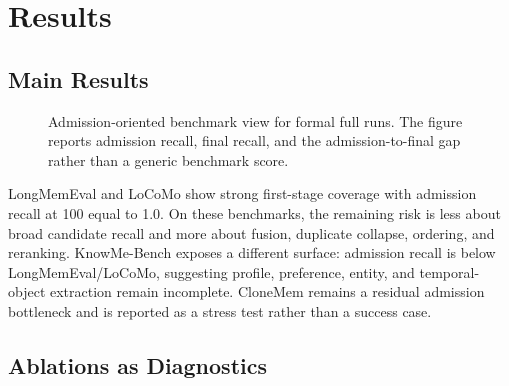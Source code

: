 \documentclass[10pt]{article}
\newcommand{\system}{DysonSpherain}
\newcommand{\artifact}[1]{\texttt{\small #1}}
\begin{document}
\section{Results}

\subsection{Main Results}

\begin{table}[t]
  \centering
  \caption{Formal full benchmark rows. Data source:
  \artifact{artifacts/formal\_protocol\_validation.json}. The admission-final
  gap is admission recall at 100 minus final recall at 10.}
  \label{tab:main-results}
  
\end{table}

\begin{table}[t]
  \centering
  \caption{Available baseline rows. \system{} rows are taken from the formal
  full source-of-truth artifact; baseline rows come from artifact-backed
  baseline tables. Missing Admission R@100 means the baseline artifact did not
  record candidate-recall diagnostics, so those rows are not used to support
  admission-specific claims.}
  \label{tab:baseline-comparison}
  
\end{table}

\begin{figure}[t]
  \centering
  
  \caption{Admission-oriented benchmark view for formal full runs. The figure
  reports admission recall, final recall, and the admission-to-final gap rather
  than a generic benchmark score.}
  \label{fig:benchmark-comparison}
\end{figure}

LongMemEval and LoCoMo show strong first-stage coverage with admission recall
at 100 equal to 1.0. On these benchmarks, the remaining risk is less about
broad candidate recall and more about fusion, duplicate collapse, ordering, and
reranking. KnowMe-Bench exposes a different surface: admission recall is below
LongMemEval/LoCoMo, suggesting profile, preference, entity, and temporal-object
extraction remain incomplete. CloneMem remains a residual admission bottleneck
and is reported as a stress test rather than a success case.

\subsection{Ablations as Diagnostics}
\end{document}
